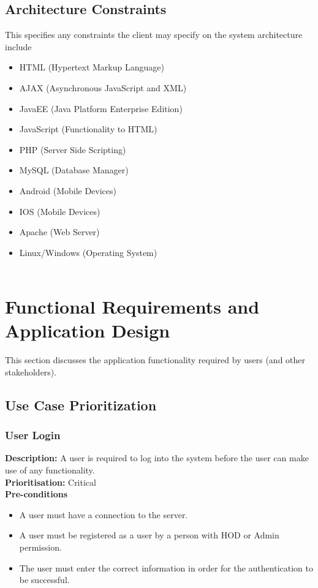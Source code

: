 \documentclass[a4paper]{article}
\begin{document}
	\subsection{Architecture Constraints}
	This specifies any constraints the client may specify on the system architecture include
	\begin{itemize}
		\item HTML (Hypertext Markup Language)
		\item AJAX (Asynchronous JavaScript and XML)
		\item JavaEE (Java Platform Enterprise Edition)
		\item JavaScript (Functionality to HTML)
		\item PHP (Server Side Scripting)
		\item MySQL (Database Manager)
		\item Android (Mobile Devices)
		\item IOS (Mobile Devices)
		\item Apache (Web Server)
		\item Linux/Windows (Operating System)
		\\
		\\
	\end{itemize}
	\pagebreak
	\section{Functional Requirements and Application Design}
	This section discusses the application functionality required by users (and other stakeholders).
	\subsection{Use Case Prioritization}
	\subsubsection{User Login}
	\textbf{Description:}  A user is required to log into the system before the user can make use of any functionality.
	\\
    \textbf{Prioritisation:} Critical\\
    
    
      \textbf{Pre-conditions}
    \begin{itemize}
        \item A user must have a connection to the server.
        \item A user must be registered as a user by a person with HOD or Admin permission.
        \item The user must enter the correct information in order for the authentication to be successful.
    \end{itemize}
    
\end{document}
